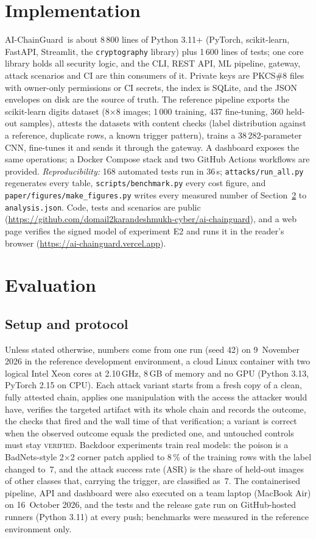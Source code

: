 \documentclass[conference]{IEEEtran}
\newcommand{\sys}{AI-ChainGuard}
\newcommand{\st}[1]{\textsc{#1}}
\begin{document}
\section{Implementation}\label{sec:impl}
\sys\ is about 8\,800 lines of Python 3.11+ (PyTorch, scikit-learn, FastAPI, Streamlit, the \texttt{cryptography} library) plus 1\,600 lines of tests; one core library holds all security logic, and the CLI, REST API, ML pipeline, gateway, attack scenarios and CI are thin consumers of it. Private keys are PKCS\#8 files with owner-only permissions or CI secrets, the index is SQLite, and the JSON envelopes on disk are the source of truth. The reference pipeline exports the scikit-learn digits dataset (8$\times$8 images; 1\,000 training, 437 fine-tuning, 360 held-out samples), attests the datasets with content checks (label distribution against a reference, duplicate rows, a known trigger pattern), trains a 38\,282-parameter CNN, fine-tunes it and sends it through the gateway. A dashboard exposes the same operations; a Docker Compose stack and two GitHub Actions workflows are provided. \emph{Reproducibility:} 168 automated tests run in 36\,s; \texttt{attacks/run\_all.py} regenerates every table, \texttt{scripts/benchmark.py} every cost figure, and \texttt{paper/figures/make\_figures.py} writes every measured number of Section~\ref{sec:eval} to \texttt{analysis.json}. Code, tests and scenarios are public (\url{https://github.com/domail2karandeshmukh-cyber/ai-chainguard}), and a web page verifies the signed model of experiment E2 and runs it in the reader's browser (\url{https://ai-chainguard.vercel.app}).

\section{Evaluation}\label{sec:eval}

\subsection{Setup and protocol}
Unless stated otherwise, numbers come from one run (seed 42) on 9~November 2026 in the reference development environment, a cloud Linux container with two logical Intel Xeon cores at 2.10\,GHz, 8\,GB of memory and no GPU (Python 3.13, PyTorch 2.15 on CPU). Each attack variant starts from a fresh copy of a clean, fully attested chain, applies one manipulation with the access the attacker would have, verifies the targeted artifact with its whole chain and records the outcome, the checks that fired and the wall time of that verification; a variant is correct when the observed outcome equals the predicted one, and untouched controls must stay \st{verified}. Backdoor experiments train real models: the poison is a BadNets-style 2$\times$2 corner patch \cite{badnets} applied to 8\,\% of the training rows with the label changed to~7, and the attack success rate (ASR) is the share of held-out images of other classes that, carrying the trigger, are classified as~7. The containerised pipeline, API and dashboard were also executed on a team laptop (MacBook Air) on 16~October 2026, and the tests and the release gate run on GitHub-hosted runners (Python 3.11) at every push; benchmarks were measured in the reference environment only.
\end{document}
